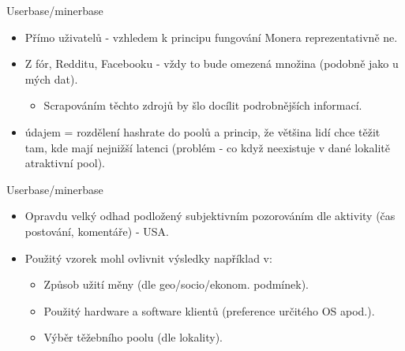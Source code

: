 \documentclass{beamer}
\begin{document}
\begin{darkframes}
        \begin{frame}{Userbase/minerbase}
     \color{aquamarine}
\begin{itemize}
\item Přímo uživatelů - vzhledem k principu fungování Monera reprezentativně ne.
\item Z fór, Redditu, Facebooku - vždy to bude omezená množina (podobně jako u mých dat).
\begin{itemize}
\item Scrapováním těchto zdrojů by šlo docílit podrobnějších informací.
\end{itemize}
\item {} údajem = rozdělení hashrate do poolů a princip, že většina lidí chce těžit tam, kde mají nejnižší latenci (problém - co když neexistuje v dané lokalitě atraktivní pool).
\end{itemize}
    \end{frame}
    
            \begin{frame}{Userbase/minerbase}
     \color{aquamarine}
\begin{itemize}
\item Opravdu velký odhad podložený subjektivním pozorováním dle aktivity (čas postování, komentáře) - USA.
\item Použitý vzorek mohl ovlivnit výsledky například v:
\begin{itemize}
\item Způsob užití měny (dle geo/socio/ekonom. podmínek).
\item Použitý hardware a software klientů (preference určitého OS apod.).
\item Výběr těžebního poolu (dle lokality).
\end{itemize}
\end{itemize}
    \end{frame}
    


\end{darkframes}
\end{document}

